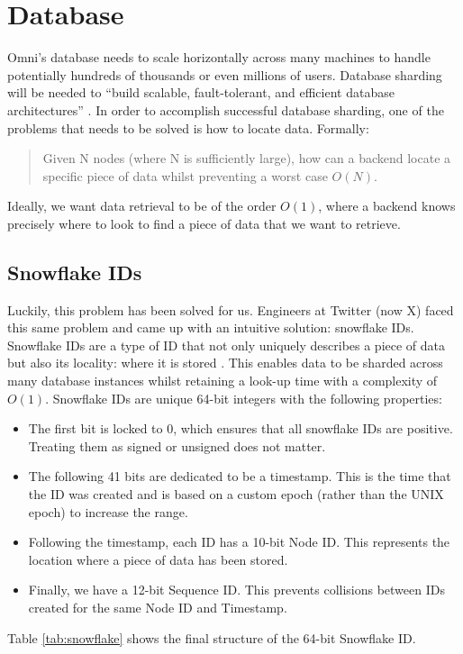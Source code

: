 \section{Database}
\label{sec:design-system-database}
Omni's database needs to scale horizontally across many machines to handle potentially hundreds of thousands or even millions of users. Database sharding will be needed to ``build scalable, fault-tolerant, and efficient database architectures'' \citep{shethiya2025load}.
In order to accomplish successful database sharding, one of the problems that needs to be solved is how to locate data. Formally:
\begin{quotation} %
Given N nodes (where N is sufficiently large), how can a backend locate a specific piece of data whilst preventing a worst case $O(N)$.
\end{quotation}
Ideally, we want data retrieval to be of the order $O(1)$, where a backend knows precisely where to look to find a piece of data that we want to retrieve.

\subsection{Snowflake IDs} 
\label{sec:design-system-database-snowflake}
Luckily, this problem has been solved for us. Engineers at Twitter (now X) faced this same problem and came up with an intuitive solution: snowflake IDs. Snowflake IDs are a type of ID that not only uniquely describes a piece of data but also its locality: where it is stored \citep{2010snowflake}. This enables data to be sharded across many database instances whilst retaining a look-up time with a complexity of $O(1)$.
Snowflake IDs are unique 64-bit integers with the following properties:
\begin{itemize}
    \item The first bit is locked to 0, which ensures that all snowflake IDs are positive. Treating them as signed or unsigned does not matter.
    \item The following 41 bits are dedicated to be a timestamp. This is the time that the ID was created and is based on a custom epoch (rather than the UNIX epoch) to increase the range.
    \item Following the timestamp, each ID has a 10-bit Node ID. This represents the location where a piece of data has been stored.
    \item Finally, we have a 12-bit Sequence ID. This prevents collisions between IDs created for the same Node ID and Timestamp.
\end{itemize}
Table \ref{tab:snowflake} shows the final structure of the 64-bit Snowflake ID.

